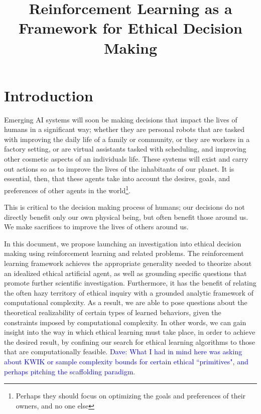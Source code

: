 \documentclass[11pt]{amsart}
\title{Reinforcement Learning as a Framework for Ethical Decision Making}
\author{}
\date{}                                           %
\newcommand\davenote[1]{\textcolor{blue}{Dave: #1}}
\begin{document}
\maketitle

\begin{abstract}

\end{abstract}

\section{Introduction}

Emerging AI systems will soon be making decisions that impact the lives of humans in a significant way; whether they are personal robots that are tasked with improving the daily life of a family or community, or they are workers in a factory setting, or are virtual assistants tasked with scheduling, and improving other cosmetic aspects of an individuals life. These systems will exist and carry out actions so as to improve the lives of the inhabitants of our planet. It is essential, then, that these agents take into account the desires, goals, and preferences of other agents in the world\footnote{Perhaps they should focus on optimizing the goals and preferences of their owners, and no one else}.

This is critical to the decision making process of humans; our decisions do not directly benefit only our  own physical being, but often benefit those around us. We make sacrifices to improve the lives of others around us.

In this document, we propose launching an investigation into ethical decision making using reinforcement learning and related problems. The reinforcement learning framework achieves the appropriate generality needed to theorize about an idealized ethical artificial agent, as well as grounding specific questions that promote further scientific investigation. Furthermore, it has the benefit of relating the often hazy territory of ethical inquiry with a grounded analytic framework of computational complexity. As a result, we are able to pose questions about the theoretical realizability of certain types of learned behaviors, given the constraints imposed by computational complexity. In other words, we can gain insight into the way in which ethical learning must take place, in order to achieve the desired result, by confining our search for ethical learning algorithms to those that are computationally feasible. \davenote{What I had in mind here was asking about KWIK or sample complexity bounds for certain ethical ``primitives", and perhaps pitching the scaffolding paradigm.}
\end{document}
